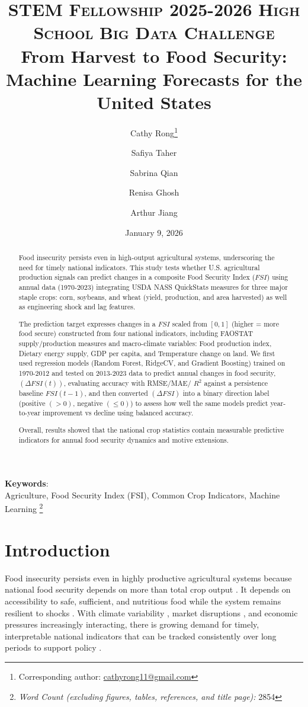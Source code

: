 \documentclass[10pt,twocolumn,letterpaper]{article}
\title{
		\usefont{OT1}{bch}{b}{n}
		\normalfont \normalsize \textsc{STEM Fellowship 2025-2026 High School Big Data Challenge} \\ [10pt]
		\huge From Harvest to Food Security: Machine Learning Forecasts for the United States\\
}
\author[1, 2]{Cathy Rong\thanks{Corresponding author: \href{mailto:cathyrong11@gmail.com}{cathyrong11@gmail.com}}}
\author[1]{Safiya Taher}
\author[1]{Sabrina Qian}
\author[1]{Renisa Ghosh}
\author[1]{Arthur Jiang}
\affil[1]{Old Scona Academic, Edmonton, Alberta, Canada}
\affil[2]{United World Colleges Red Cross Nordic, Flekke, Vestland, Norway}
\date{January 9, 2026}
\newcommand{\WordCountfootnote}{
\begingroup
\renewcommand\thefootnote{}
\footnote{\textit{Word Count (excluding figures, tables, references, and title page):} 2854}
\addtocounter{footnote}{-1}
\endgroup
}
\begin{document}
\maketitle

\begin{abstract}
Food insecurity persists even in high-output agricultural systems, underscoring the need for timely national indicators. This study tests whether U.S. agricultural production signals can predict changes in a composite Food Security Index ($FSI$) using annual data (1970-2023) integrating USDA NASS QuickStats measures for three major staple crops: corn, soybeans, and wheat (yield, production, and area harvested) as well as engineering shock and lag features.

The prediction target expresses changes in a $FSI$ scaled from $[0,1]$ (higher = more food secure) constructed from four national indicators, including FAOSTAT supply/production measures and macro-climate variables: Food production index, Dietary energy supply, GDP per capita, and Temperature change on land. We first used regression models (Random Forest, RidgeCV, and Gradient Boosting) trained on 1970-2012 and tested on 2013-2023 data to predict annual changes in food security, $(\Delta FSI(t))$, evaluating accuracy with RMSE/MAE/ $R^2$ against a persistence baseline $FSI(t-1)$, and then converted $(\Delta FSI)$ into a binary direction label (positive $(>0)$, negative $(\le 0)$) to assess how well the same models predict year-to-year improvement vs decline using balanced accuracy.

Overall, results showed that the national crop statistics contain measurable predictive indicators for annual food security dynamics and motive extensions.

\end{abstract}  
{\textbf{Keywords}: \\ 
Agriculture, Food Security Index (FSI), Common Crop Indicators, Machine Learning}\WordCountfootnote

\section{Introduction}

Food insecurity persists even in highly productive agricultural systems because national food security depends on more than total crop output \cite{Long2020}. It depends on accessibility to safe, sufficient, and nutritious food while the system remains resilient to shocks \cite{Kavallari2014}. With climate variability \cite{Beach2010}, market disruptions \cite{Barnichon2022}, and economic pressures increasingly interacting, there is growing demand for timely, interpretable national indicators that can be tracked consistently over long periods to support policy \cite{Hatfield2011}.
\end{document}
